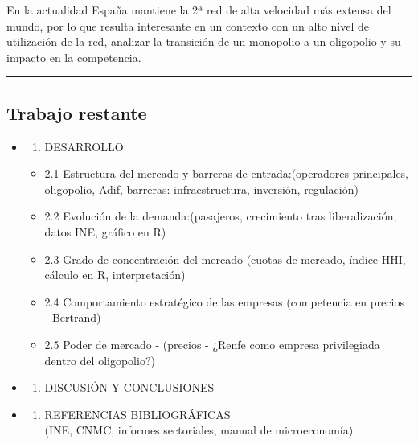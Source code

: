 \documentclass[
  letterpaper,
  DIV=11,
  numbers=noendperiod]{scrartcl}
\providecommand{\tightlist}{%
  \setlength{\itemsep}{0pt}\setlength{\parskip}{0pt}}
\begin{document}
En la actualidad España mantiene la 2ª red de alta velocidad más extensa
del mundo, por lo que resulta interesante en un contexto con un alto
nivel de utilización de la red, analizar la transición de un monopolio a
un oligopolio y su impacto en la competencia.

\begin{center}\rule{0.5\linewidth}{0.5pt}\end{center}

\subsection{Trabajo restante}\label{trabajo-restante}

\begin{itemize}
\item
  \begin{enumerate}
  \def\labelenumi{\arabic{enumi}.}
  \setcounter{enumi}{1}
  \tightlist
  \item
    DESARROLLO
  \end{enumerate}

  \begin{itemize}
  \tightlist
  \item
    2.1 Estructura del mercado y barreras de entrada:(operadores
    principales, oligopolio, Adif, barreras: infraestructura, inversión,
    regulación)
  \item
    2.2 Evolución de la demanda:(pasajeros, crecimiento tras
    liberalización, datos INE, gráfico en R)
  \item
    2.3 Grado de concentración del mercado (cuotas de mercado, índice
    HHI, cálculo en R, interpretación)
  \item
    2.4 Comportamiento estratégico de las empresas (competencia en
    precios - Bertrand)
  \item
    2.5 Poder de mercado - (precios - ¿Renfe como empresa privilegiada
    dentro del oligopolio?)
  \end{itemize}
\item
  \begin{enumerate}
  \def\labelenumi{\arabic{enumi}.}
  \setcounter{enumi}{2}
  \tightlist
  \item
    DISCUSIÓN Y CONCLUSIONES
  \end{enumerate}
\item
  \begin{enumerate}
  \def\labelenumi{\arabic{enumi}.}
  \setcounter{enumi}{3}
  \tightlist
  \item
    REFERENCIAS BIBLIOGRÁFICAS\\
    (INE, CNMC, informes sectoriales, manual de microeconomía)
  \end{enumerate}
\end{itemize}
\end{document}
